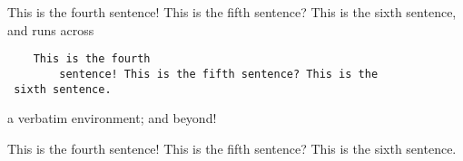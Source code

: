 This is the fourth sentence!
This is the fifth sentence?
This is the sixth sentence, and runs across \begin{verbatim}
    This is the fourth
        sentence! This is the fifth sentence? This is the
 sixth sentence.
\end{verbatim} a verbatim environment; and beyond!

This is the fourth sentence!
This is the fifth sentence?
This is the sixth sentence.
